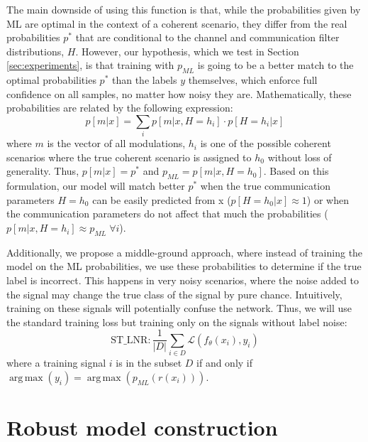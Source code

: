 \documentclass[conference]{IEEEtran}
\newcommand{\pf}[1]{{\textcolor{orange}{PF: {#1}}}}
\newcommand{\Ls}{\mathcal{L}}
\DeclareMathOperator*{\argmax}{arg\,max}
\begin{document}
The main downside of using this function is that, while the probabilities given by ML are optimal in the context of a coherent scenario, they differ from the real probabilities $p^{*}$ that are conditional to the channel and communication filter distributions, $H$. However, our hypothesis, which we test in Section \ref{sec:experiments}, is that training with $p_{ML}$ is going to be a better match to the optimal probabilities $p^{*}$ than the labels $y$ themselves, which enforce full confidence on all samples, no matter how noisy they are. Mathematically, these probabilities are related by the following expression:
\begin{equation}
	p[m|x] =  \sum_i p[m|x,H=h_i] \cdot p[H=h_i|x]
\end{equation}
where $m$ is the vector of all modulations, $h_i$ is one of the possible coherent scenarios where the true coherent scenario is assigned to $h_0$ without loss of generality. Thus, $p[m|x] = p^{*}$ and $p_{ML} = p[m|x,H=h_0]$. Based on this formulation, our model will match better $p^{*}$ when the true communication parameters $H=h_0$ can be easily predicted from x ($p[H=h_0|x] \approx 1$) or when the communication parameters do not affect that much the probabilities ($p[m|x,H=h_i] \approx p_{ML} \; \forall i$).

Additionally, we propose a middle-ground approach, where instead of training the model on the ML probabilities, we use these probabilities to determine if the true label is incorrect. This happens in very noisy scenarios, where the noise added to the signal may change the true class of the signal by pure chance. Intuitively, training on these signals will potentially confuse the network. Thus, we will use the standard training loss but training only on the signals without label noise:
\begin{equation}
    \text{ST\_LNR} : \dfrac{1}{|D|}\sum_{i \in D}\Ls(f_{\theta}(x_i), y_i)
\end{equation}
where a training signal $i$ is in the subset $D$ if and only if $\argmax(y_i) = \argmax(p_{ML}(r(x_i)))$.


\section{Robust model construction}

\end{document}
